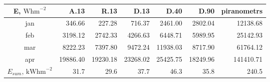 \begin{tabular}{ | c | r r r r r r | } \hline
E, $\textrm{Whm}^{-2}$	&A.13	&R.13	&D.13	&D.40	&D.90	&piranometrs\\ \hline
jan		&346.66	&227.28	&716.37	&2461.00	&2802.04	&12138.68\\
feb		&3198.12	&2742.33	&4266.63	&6448.71	&5989.95	&25142.93\\
mar		&8222.23	&7397.80	&9472.24	&11938.03	&8717.90	&61764.12\\
apr		&19886.40	&19230.18	&23268.02	&25425.75	&18249.96	&141410.71\\ \hline
$E_{sum}$, $\textrm{kWhm}^{-2}$	&31.7	&29.6	&37.7	&46.3	&35.8	&240.5\\ \hline
\end{tabular}